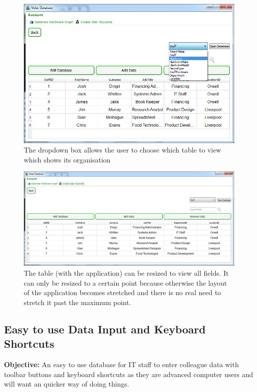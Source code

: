 \begin{figure}[H]
    \includegraphics[width=\textwidth]{./Evaluation/Images/cleardb2.png}
    \caption{The dropdown box allows the user to choose which table to view which shows its organisation} 
\end{figure}

\begin{figure}[H]
    \includegraphics[width=\textwidth]{./Evaluation/Images/cleardb3.png}
    \caption{The table (with the application) can be resized to view all fields. It can only be resized to a certain point because otherwise the layout of the application becomes stretched and there is no real need to stretch it past the maximum point.} 
\end{figure}


\subsection{Easy to use Data Input and Keyboard Shortcuts}

\textbf{Objective:} An easy to use database for IT staff to enter colleague data with toolbar buttons and keyboard shortcuts as they are advanced computer users and will want an quicker way of doing things.

